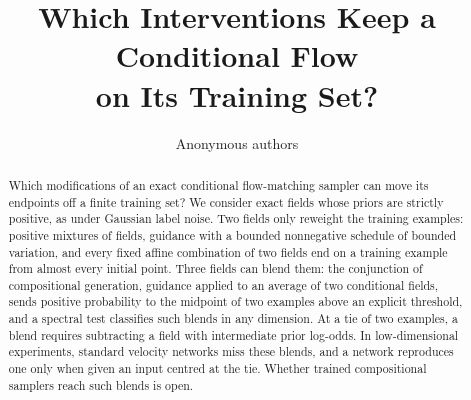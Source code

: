 \documentclass{article} %
\title{Which Interventions Keep a Conditional Flow\\
on Its Training Set?}
\author{Anonymous authors}
\theoremstyle{plain}
\theoremstyle{definition}
\theoremstyle{remark}
\begin{document}
\maketitle
\raggedbottom

\begin{abstract}
Which modifications of an exact conditional flow-matching sampler can move its endpoints off a
finite training set? We consider exact fields whose priors are strictly positive, as under
Gaussian label noise. Two fields only reweight the training examples: positive mixtures of fields,
guidance with a bounded nonnegative schedule of bounded variation, and every fixed
affine combination of two fields end on a training example from almost every initial point. Three
fields can blend them: the conjunction of compositional generation, guidance applied to an average
of two conditional fields, sends positive probability to the midpoint of two examples above an
explicit threshold, and a spectral test classifies such blends in any dimension. At a tie of two
examples, a blend requires subtracting a field with intermediate prior log-odds. In low-dimensional
experiments, standard velocity networks miss these blends, and a network reproduces one only when
given an input centred at the tie. Whether trained compositional samplers reach such blends is
open.
\end{abstract}

\end{document}
